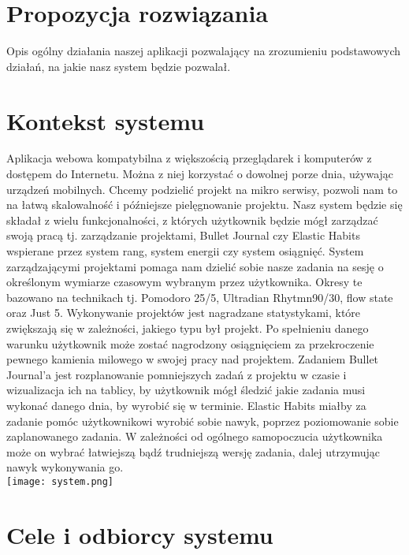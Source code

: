 \documentclass[a4paper,11pt]{report}
\begin{document}
\section {Propozycja rozwiązania}
Opis ogólny działania naszej aplikacji pozwalający na zrozumieniu podstawowych działań,
 na jakie nasz system będzie pozwalał.
\section {Kontekst systemu}
Aplikacja webowa kompatybilna z większością przeglądarek i komputerów z dostępem do Internetu.
 Można z niej korzystać o dowolnej porze dnia, używając urządzeń mobilnych.
 Chcemy podzielić projekt na mikro serwisy,
 pozwoli nam to na łatwą skalowalność i późniejsze pielęgnowanie projektu.
 Nasz system będzie się składał z wielu funkcjonalności,
 z których użytkownik będzie mógł zarządzać swoją pracą tj. zarządzanie projektami,
 Bullet Journal czy Elastic Habits\cite{elastic} wspierane przez system rang,
 system energii czy system osiągnięć.
 System zarządzającymi projektami pomaga nam dzielić sobie nasze zadania na sesję o określonym wymiarze
 czasowym wybranym przez użytkownika.
 Okresy te bazowano na technikach tj. Pomodoro\cite{Pomodoro} 25/5, Ultradian Rhytmn\cite{90/30}90/30,
 flow state\cite{flow} oraz Just 5\cite{just5}.
 Wykonywanie projektów jest nagradzane statystykami, które zwiększają się w zależności, jakiego typu był projekt.
 Po spełnieniu danego warunku użytkownik może zostać nagrodzony osiągnięciem za przekroczenie pewnego kamienia milowego
 w swojej pracy nad projektem.
 Zadaniem Bullet Journal’a jest rozplanowanie pomniejszych zadań z projektu w czasie i wizualizacja ich na tablicy,
 by użytkownik mógł śledzić jakie zadania musi wykonać danego dnia, by wyrobić się w terminie.
 Elastic Habits miałby za zadanie pomóc użytkownikowi wyrobić sobie nawyk,
 poprzez poziomowanie sobie zaplanowanego zadania.
 W zależności od ogólnego samopoczucia użytkownika może on wybrać łatwiejszą bądź trudniejszą wersję zadania, dalej utrzymując nawyk wykonywania go. \\
\texttt{[image: system.png]}
\section {Cele i odbiorcy systemu}
\end{document}
